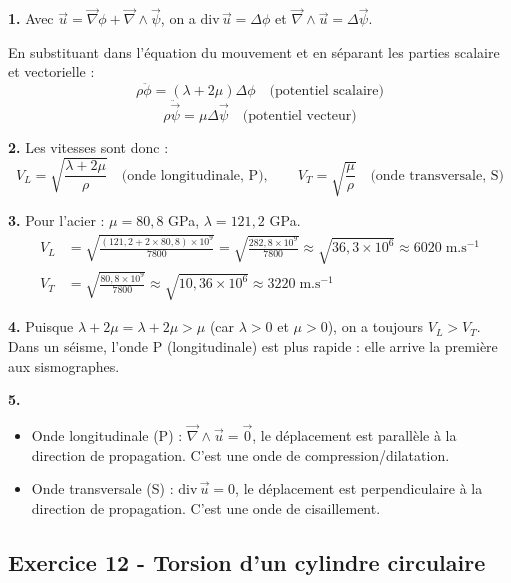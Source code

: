 \documentclass[12pt,a4paper]{article}
\begin{document}
\begin{boitecorrige}
\textbf{1.} Avec $\vec{u} = \vec{\nabla}\phi + \vec{\nabla}\wedge\vec{\psi}$, on a $\text{div}\,\vec{u} = \Delta\phi$ et $\vec{\nabla}\wedge\vec{u} = \Delta\vec{\psi}$.

En substituant dans l'équation du mouvement et en séparant les parties scalaire et vectorielle :
\[
\rho\ddot\phi = (\lambda+2\mu)\Delta\phi \quad\text{(potentiel scalaire)}
\]
\[
\rho\ddot{\vec{\psi}} = \mu\Delta\vec{\psi} \quad\text{(potentiel vecteur)}
\]

\textbf{2.} Les vitesses sont donc :
\[
V_L = \sqrt{\frac{\lambda+2\mu}{\rho}} \quad\text{(onde longitudinale, P)}, \qquad V_T = \sqrt{\frac{\mu}{\rho}} \quad\text{(onde transversale, S)}
\]

\textbf{3.} Pour l'acier : $\mu = 80{,}8$ GPa, $\lambda = 121{,}2$ GPa.
\begin{align*}
V_L &= \sqrt{\frac{(121{,}2+2\times80{,}8)\times10^9}{7800}} = \sqrt{\frac{282{,}8\times10^9}{7800}}\approx\sqrt{36{,}3\times10^6}\approx 6020\;\text{m.s}^{-1}\\
V_T &= \sqrt{\frac{80{,}8\times10^9}{7800}}\approx\sqrt{10{,}36\times10^6}\approx 3220\;\text{m.s}^{-1}
\end{align*}

\textbf{4.} Puisque $\lambda+2\mu = \lambda + 2\mu > \mu$ (car $\lambda>0$ et $\mu>0$), on a toujours $V_L > V_T$. Dans un séisme, l'onde P (longitudinale) est plus rapide : elle arrive la première aux sismographes.

\textbf{5.}
\begin{itemize}
  \item Onde longitudinale (P) : $\vec{\nabla}\wedge\vec{u}=\vec{0}$, le déplacement est parallèle à la direction de propagation. C'est une onde de compression/dilatation.
  \item Onde transversale (S) : $\text{div}\,\vec{u}=0$, le déplacement est perpendiculaire à la direction de propagation. C'est une onde de cisaillement.
\end{itemize}
\end{boitecorrige}

\subsection*{Exercice 12 - Torsion d'un cylindre circulaire \niveau{\difficile}}
\end{document}
